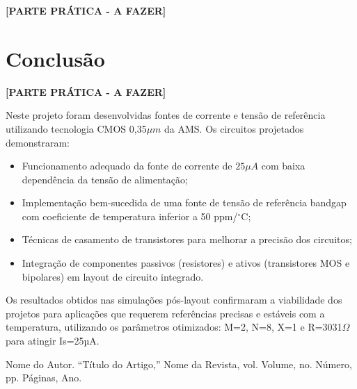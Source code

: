 \documentclass[12pt,a4paper]{article}
\newcommand{\degree}{\ensuremath{{}^\circ}}
\begin{document}
\t\textbf{[PARTE PRÁTICA - A FAZER]}

\section*{Conclusão}

\t\textbf{[PARTE PRÁTICA - A FAZER]}

Neste projeto foram desenvolvidas fontes de corrente e tensão de referência utilizando tecnologia CMOS 0,35$\mu m$ da AMS. Os circuitos projetados demonstraram:

\begin{itemize}
    \item Funcionamento adequado da fonte de corrente de $25\mu A$ com baixa dependência da tensão de alimentação;
    \item Implementação bem-sucedida de uma fonte de tensão de referência bandgap com coeficiente de temperatura inferior a 50 ppm/$\degree$C;
    \item Técnicas de casamento de transistores para melhorar a precisão dos circuitos;
    \item Integração de componentes passivos (resistores) e ativos (transistores MOS e bipolares) em layout de circuito integrado.
\end{itemize}

Os resultados obtidos nas simulações pós-layout confirmaram a viabilidade dos projetos para aplicações que requerem referências precisas e estáveis com a temperatura, utilizando os parâmetros otimizados: M=2, N=8, X=1 e R=3031$\Omega$ para atingir Is=25µA.

{}
\begin{thebibliography}{99}
     Nome do Autor. ``Título do Artigo,'' Nome da Revista, vol. Volume, no. Número, pp. Páginas, Ano.
\end{thebibliography}
\end{document}
